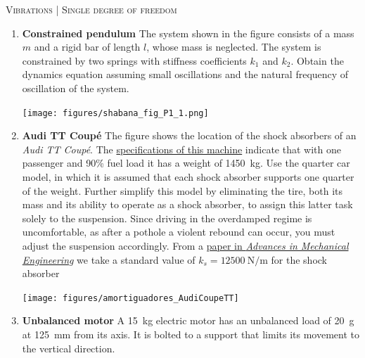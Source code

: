 \documentclass[11pt, english, a4paper, twopage]{article}
\begin{document}
\begin{center}
 \textsc{\large Vibrations | Single degree of freedom}
\end{center}
\begin{enumerate}
\item
\begin{minipage}[t][4cm]{0.65\textwidth}
 \textbf{Constrained pendulum}
 The system shown in the figure consists of a mass $m$ and a rigid bar of length $l$, whose mass is neglected.
 The system is constrained by two springs with stiffness coefficients $k_1$ and $k_2$.
 Obtain the dynamics equation assuming small oscillations and the natural frequency of oscillation of the system.
\end{minipage}
\begin{minipage}[c][3cm][t]{0.3\textwidth}
 \texttt{[image: figures/shabana\_fig\_P1\_1.png]}
\end{minipage}
\item
\begin{minipage}[t][6cm]{0.65\textwidth}
 \textbf{Audi TT Coupé}
 The figure shows the location of the shock absorbers of an \emph{Audi TT Coupé}.
 The \href{https://media.audiusa.com/assets/documents/original/8253-FINAL2021TTTechSpecs.pdf}{specifications of this machine} indicate that with one passenger and 90\% fuel load it has a weight of \SI{1450}{\kilo\gram}.
 Use the quarter car model, in which it is assumed that each shock absorber supports one quarter of the weight.
 Further simplify this model by eliminating the tire, both its mass and its ability to operate as a shock absorber, to assign this latter task solely to the suspension.
 Since driving in the overdamped regime is uncomfortable, as after a pothole a violent rebound can occur, you must adjust the suspension accordingly.
 From a \href{https://journals.sagepub.com/doi/pdf/10.1177/1687814016648638}{paper in \emph{Advances in Mechanical Engineering}} we take a standard value of $k_s = \SI{12500}{\newton\per\metre}$ for the shock absorber
\end{minipage}
\begin{minipage}[c][0cm][t]{0.3\textwidth}
 \texttt{[image: figures/amortiguadores\_AudiCoupeTT]}
\end{minipage}
\item
 \begin{minipage}[t][3.5cm]{0.75\textwidth}
 \textbf{Unbalanced motor}
 A \SI{15}{\kilo\gram} electric motor has an unbalanced load of \SI{20}{\gram} at \SI{125}{\milli\metre} from its axis.
 It is bolted to a support that limits its movement to the vertical direction.

\end{minipage}
\end{enumerate}
\end{document}
